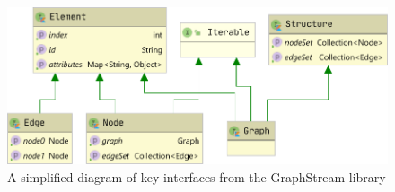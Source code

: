 \begin{figure}[h]
\includegraphics[width=0.65\linewidth]{graphstream_diagram.pdf}
\caption{A simplified diagram of key interfaces from the GraphStream library}
\label{fig:graphstream_diagram}
\end{figure}
